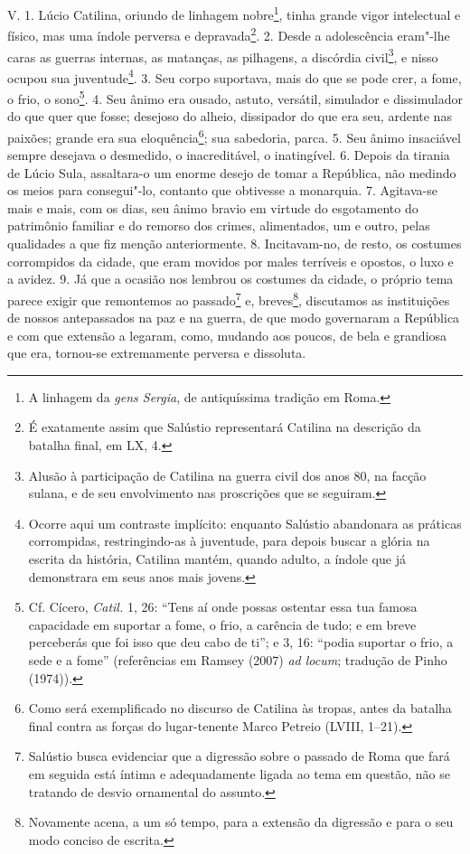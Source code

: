 V. 1. Lúcio Catilina, oriundo de linhagem nobre\footnote{A linhagem da
\emph{gens Sergia}, de antiquíssima tradição em Roma.}, tinha grande vigor
intelectual e físico, mas uma índole perversa e depravada\footnote{É exatamente
assim que Salústio representará Catilina na descrição da batalha final, em LX,
4.}. 2. Desde a adolescência eram"-lhe caras as guerras internas, as matanças,
as pilhagens, a discórdia civil\footnote{Alusão à participação de Catilina na
guerra civil dos anos 80, na facção sulana, e de seu envolvimento nas
proscrições que se seguiram.}, e nisso ocupou sua juventude\footnote{Ocorre
aqui um contraste implícito: enquanto Salústio abandonara as práticas
corrompidas, restringindo-as à juventude, para depois buscar a glória na
escrita da história, Catilina mantém, quando adulto, a índole que já
demonstrara em seus anos mais jovens.}. 3. Seu corpo suportava, mais do que se
pode crer, a fome, o frio, o sono\footnote{Cf. Cícero, \emph{Catil.} 1,
26:  ``Tens aí onde possas ostentar essa tua famosa capacidade em suportar a
fome, o frio, a carência de tudo; e em breve perceberás que foi isso que deu
cabo de ti''; e 3, 16: ``podia suportar o frio, a sede e a fome'' (referências
em Ramsey (2007) \emph{ad locum}; tradução de Pinho (1974)).}. 4. Seu ânimo era
ousado, astuto, versátil, simulador e dissimulador do que quer que fosse;
desejoso do alheio, dissipador do que era seu, ardente nas paixões; grande era
sua eloquência\footnote{Como será exemplificado no
discurso de Catilina às tropas, antes da batalha final contra as forças do
lugar-tenente Marco Petreio (LVIII, 1--21).}; sua sabedoria, parca. 5. Seu ânimo insaciável sempre
desejava o desmedido, o inacreditável, o inatingível. 6. Depois da tirania de
Lúcio Sula, assaltara-o um enorme desejo de tomar a República, não medindo os
meios para consegui"-lo, contanto que obtivesse a monarquia. 7. Agitava-se mais
e mais, com os dias, seu ânimo bravio em virtude do esgotamento do patrimônio
familiar e do remorso dos crimes, alimentados, um e outro, pelas qualidades a
que fiz menção anteriormente. 8. Incitavam-no, de resto, os costumes
corrompidos da cidade, que eram movidos por males terríveis e opostos, o luxo e
a avidez. 9. Já que a ocasião nos lembrou os costumes da cidade, o próprio tema
parece exigir que remontemos ao passado\footnote{Salústio busca evidenciar que
a digressão sobre o passado de Roma que fará em seguida está íntima e
adequadamente ligada ao tema em questão, não se tratando de desvio ornamental
do assunto.} e, breves\footnote{Novamente acena, a um só tempo, para a extensão
da digressão e para o seu modo conciso de escrita.}, discutamos as instituições
de nossos antepassados na paz e na guerra, de que modo governaram a República e
com que extensão a legaram, como, mudando aos poucos, de bela e grandiosa que
era, tornou-se extremamente perversa e dissoluta.

